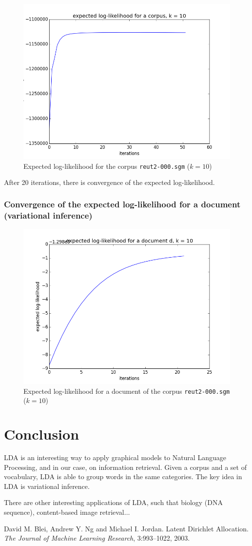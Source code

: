 \documentclass{article}
\begin{document}
\begin{figure}[ht!]
\begin{center}
\includegraphics[width=0.5\linewidth]{../img/k=10/log_likelihood_corpus_k=10.png}
\caption{Expected log-likelihood for the corpus \texttt{reut2-000.sgm} ($k=10$)}
\end{center}
\end{figure}

After 20 iterations, there is convergence of the expected log-likelihood.

\subsubsection*{Convergence of the expected log-likelihood for a document (variational inference)}

\begin{figure}[ht!]
\begin{center}
\includegraphics[width=0.5\linewidth]{../img/k=10/log_likelihood_document_k=10.png}
\caption{Expected log-likelihood for a document of the corpus \texttt{reut2-000.sgm} ($k=10$)}
\end{center}
\end{figure}

\section{Conclusion}

LDA is an interesting way to apply graphical models to Natural Language Processing, and in our case, on information retrieval. Given a corpus and a set of vocabulary, LDA is able to group words in the same categories. The key idea in LDA is variational inference. 

There are other interesting applications of LDA, such that biology (DNA sequence), content-based image retrieval$\ldots$

\begin{thebibliography}{BNJ03}
 David M. Blei, Andrew Y. Ng and Michael I. Jordan. Latent Dirichlet Allocation. \emph{The Journal of Machine Learning Research}, 3:993--1022, 2003.
\end{thebibliography}
\end{document}
